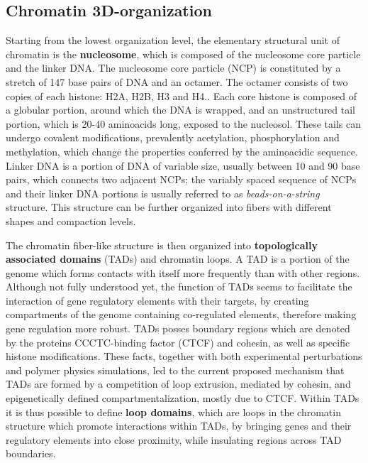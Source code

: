 \subsection{Chromatin 3D-organization}

Starting from the lowest organization level, the elementary structural unit of chromatin is the \textbf{nucleosome}, which is composed of the nucleosome core particle and the linker DNA. The nucleosome core particle (NCP) is constituted by a stretch of 147 base pairs of DNA and an octamer. The octamer consists of two copies of each histone: H2A, H2B, H3 and H4.\cite{nucleosomecore1997}. Each core histone is composed of a globular portion, around which the DNA is wrapped, and an unstructured tail portion, which is 20-40 aminoacids long, exposed to the nucleosol. These tails can undergo covalent modifications, prevalently acetylation, phosphorylation and methylation, which change the properties conferred by the aminoacidic sequence\cite{histonemodifications2020}. Linker DNA is a portion of DNA of variable size, usually between 10 and 90 base pairs, which connects two adjacent NCPs; the variably spaced sequence of NCPs and their linker DNA portions is usually referred to as \emph{beads-on-a-string} structure. This structure can be further organized into fibers with different shapes and compaction levels\cite{chromatinfiber2015}.

The chromatin fiber-like structure is then organized into \textbf{topologically associated domains} (TADs) and chromatin loops. A TAD is a portion of the genome which forms contacts with itself more frequently than with other regions. Although not fully understood yet, the function of TADs seems to facilitate the interaction of gene regulatory elements with their targets, by creating compartments of the genome containing co-regulated elements, therefore making gene regulation more robust\cite{tadrole2018}. TADs posses boundary regions which are denoted by the proteins CCCTC-binding factor (CTCF) and cohesin, as well as specific histone modifications\cite{chromatindevelopment2019}. These facts, together with both experimental perturbations and polymer physics simulations, led to the current proposed mechanism that TADs are formed by a competition of loop extrusion, mediated by cohesin, and epigenetically defined compartmentalization, mostly due to CTCF\cite{tadformation2018}. Within TADs it is thus possible to define \textbf{loop domains}, which are loops in the chromatin structure which promote interactions within TADs, by bringing genes and their regulatory elements into close proximity, while insulating regions across TAD boundaries\cite{chromatindevelopment2019}. 

